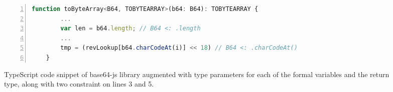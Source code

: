 \documentclass[acmsmall, review, anonymous]{acmart}\settopmatter{printfolios=true,printccs=false,printacmref=false}
\begin{document}
\begin{figure*}[t]
    \begin{minipage}[c]{\textwidth}
\begin{lstlisting}[language=JavaScript,numbers=left]
    function toByteArray<B64, TOBYTEARRAY>(b64: B64): TOBYTEARRAY {
        ...
        var len = b64.length; // B64 <: .length
        ...
        tmp = (revLookup[b64.charCodeAt(i)] << 18) // B64 <: .charCodeAt()
    }
\end{lstlisting}
    \end{minipage}
    \caption{TypeScript code snippet of base64-js library augmented with type parameters for each of the formal variables and the return type, along with two constraint on lines 3 and 5.}\label{fig:jscode-base64}
\end{figure*}
\end{document}
